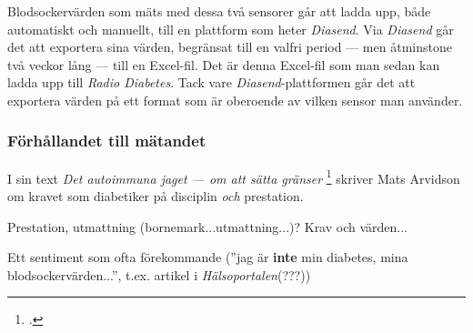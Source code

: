 \documentclass[11pt, a4paper]{article} %
\begin{document}
Blodsockervärden som mäts med dessa två sensorer går att ladda upp, både automatiskt och manuellt, till en plattform som heter \emph{Diasend}. Via \emph{Diasend} går det att exportera sina värden, begränsat till en valfri period --- men åtminstone två veckor lång --- till en Excel-fil. Det är denna Excel-fil som man sedan kan ladda upp till \emph{Radio Diabetes}. Tack vare \emph{Diasend}-plattformen går det att exportera värden på ett format som är oberoende av vilken sensor man använder.



\subsubsection*{Förhållandet till mätandet}
I sin text \emph{Det autoimmuna jaget --- om att sätta gränser} \footcite[286]{arvidson_det_2016} skriver Mats Arvidson om kravet som diabetiker på disciplin \emph{och} prestation.

Prestation, utmattning (bornemark...utmattning...)? Krav och värden... 

Ett sentiment som ofta förekommande (''jag är \textbf{inte} min diabetes, mina blodsockervärden...'', t.ex. artikel i \emph{Hälsoportalen}(???))
\end{document}
